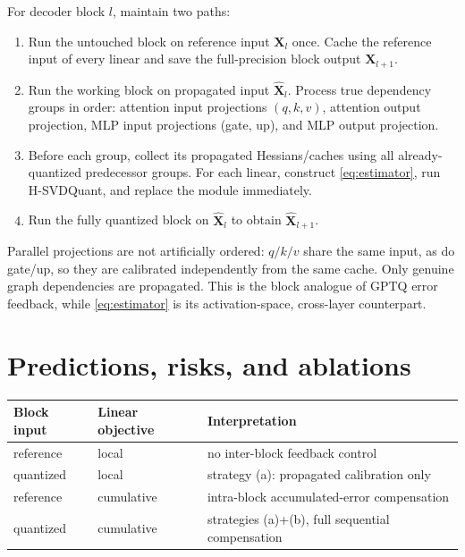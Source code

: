 \documentclass[11pt]{article}
\newcommand{\X}{\bm X}
\newcommand{\Xh}{\widehat{\bm X}}
\begin{document}
For decoder block $l$, maintain two paths:
\begin{enumerate}[leftmargin=2em]
  \item Run the untouched block on reference input $\X_l$ once.  Cache the
        reference input of every linear and save the full-precision block output
        $\X_{l+1}$.
  \item Run the working block on propagated input $\Xh_l$.  Process true
        dependency groups in order: attention input projections
        $(q,k,v)$, attention output projection, MLP input projections
        (gate, up), and MLP output projection.
  \item Before each group, collect its propagated Hessians/caches using all
        already-quantized predecessor groups.  For each linear, construct
        \eqref{eq:estimator}, run H-SVDQuant, and replace the module immediately.
  \item Run the fully quantized block on $\Xh_l$ to obtain $\Xh_{l+1}$.
\end{enumerate}
Parallel projections are not artificially ordered: $q/k/v$ share the same
input, as do gate/up, so they are calibrated independently from the same cache.
Only genuine graph dependencies are propagated.  This is the block analogue of
GPTQ error feedback, while \eqref{eq:estimator} is its activation-space,
cross-layer counterpart.

\section{Predictions, risks, and ablations}

\begin{table}[h]
\centering
\begin{tabular}{lll}
\toprule
Block input & Linear objective & Interpretation \\
\midrule
reference & local & no inter-block feedback control \\
quantized & local & strategy (a): propagated calibration only \\
reference & cumulative & intra-block accumulated-error compensation \\
quantized & cumulative & strategies (a)+(b), full sequential compensation \\
\bottomrule
\end{tabular}
\end{table}
\end{document}
